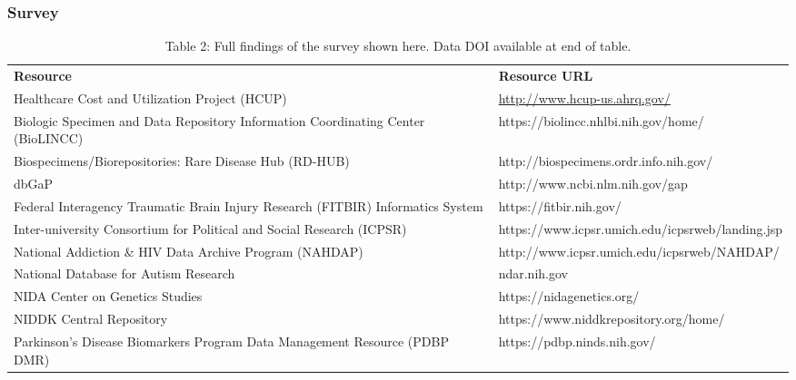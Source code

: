 \documentclass{article}
\begin{document}
\subsubsection{Survey}\label{H3599814}


\begin{table}
\caption*{Table 2: Full findings of the survey shown here. Data DOI available at end of table.}\label{T21405461}

\begin{tabu} to \textwidth { |X|X| }
\hline



\textbf{Resource} & \textbf{Resource URL}
 \\


Healthcare Cost and Utilization Project (HCUP) & \href{http://www.hcup-us.ahrq.gov/}{http://www.hcup-us.ahrq.gov/}
 \\


Biologic Specimen and Data Repository Information Coordinating Center (BioLINCC) & https://biolincc.nhlbi.nih.gov/home/
 \\


Biospecimens/Biorepositories: Rare Disease Hub (RD-HUB) & http://biospecimens.ordr.info.nih.gov/
 \\


dbGaP & http://www.ncbi.nlm.nih.gov/gap
 \\


Federal Interagency Traumatic Brain Injury Research (FITBIR) Informatics System & https://fitbir.nih.gov/
 \\


Inter-university Consortium for Political and Social Research (ICPSR) & https://www.icpsr.umich.edu/icpsrweb/landing.jsp
 \\


National Addiction \& HIV Data Archive Program (NAHDAP) & http://www.icpsr.umich.edu/icpsrweb/NAHDAP/
 \\


National Database for Autism Research & ndar.nih.gov
 \\


NIDA Center on Genetics Studies & https://nidagenetics.org/
 \\


NIDDK Central Repository & https://www.niddkrepository.org/home/
 \\


Parkinson’s Disease Biomarkers Program Data Management Resource (PDBP DMR) & https://pdbp.ninds.nih.gov/
 \\



\end{tabu}
\end{table}
\end{document}
